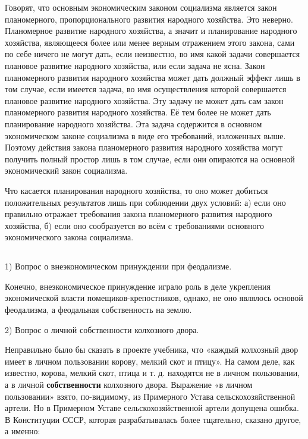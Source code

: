 \documentclass[12pt, a4paper, openany]{book}
\begin{document}
Говорят, что основным экономическим законом социализма является закон планомерного, пропорционального развития народного хозяйства. Это неверно. Планомерное развитие народного хозяйства, а значит и планирование народного хозяйства, являющееся более или менее верным отражением этого закона, сами по себе ничего не могут дать, если неизвестно, во имя какой задачи совершается плановое развитие народного хозяйства, или если задача не ясна. Закон планомерного развития народного хозяйства может дать должный эффект лишь в том случае, если имеется задача, во имя осуществления которой совершается плановое развитие народного хозяйства. Эту задачу не может дать сам закон планомерного развития народного хозяйства. Её тем более не может дать планирование народного хозяйства. Эта задача содержится в основном экономическом законе социализма в виде его требований, изложенных выше. Поэтому действия закона планомерного развития народного хозяйства могут получить полный простор лишь в том случае, если они опираются на основной экономический закон социализма.



Что касается планирования народного хозяйства, то оно может добиться положительных результатов лишь при соблюдении двух условий: а) если оно правильно отражает требования закона планомерного развития народного хозяйства, б) если оно сообразуется во всём с требованиями основного экономического закона социализма.



\vspace{0.4cm}



\subsection[8. Другие вопросы]{}



1) Вопрос о внеэкономическом принуждении при феодализме.



Конечно, внеэкономическое принуждение играло роль в деле укрепления экономической власти помещиков-крепостников, однако, не оно являлось основой феодализма, а феодальная собственность на землю.



2) Вопрос о личной собственности колхозного двора.



Неправильно было бы сказать в проекте учебника, что «каждый колхозный двор имеет в личном пользовании корову, мелкий скот и птицу». На самом деле, как известно, корова, мелкий скот, птица и т. д. находятся не в личном пользовании, а в личной \textbf{собственности} колхозного двора. Выражение «в личном пользовании» взято, по-видимому, из Примерного Устава сельскохозяйственной артели. Но в Примерном Уставе сельскохозяйственной артели допущена ошибка. В Конституции СССР, которая разрабатывалась более тщательно, сказано другое, а именно:
\end{document}
